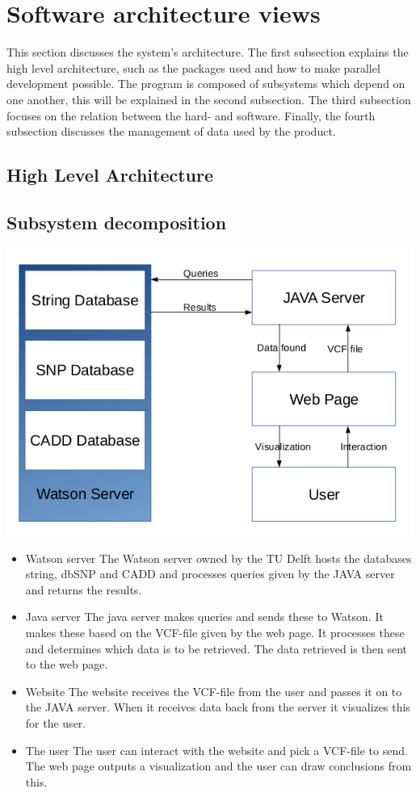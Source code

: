 \section{Software architecture views}
	This section discusses the system's architecture. The first subsection explains the high level architecture, such as the packages used and how to make parallel development possible. The program is composed of subsystems which depend on one another, this will be explained in the second subsection. The third subsection focuses on the relation between the hard- and software. Finally, the fourth subsection discusses the management of data used by the product.
	\subsection{High Level Architecture}
	\subsection{Subsystem decomposition}
		\includegraphics[scale=0.5]{schema1.png}
		\begin{itemize}
			\item Watson server
				\subitem The Watson server owned by the TU Delft hosts the databases string\cite{franceschini2013string}, dbSNP\cite{sherry2001dbsnp} and CADD\cite{kircher2014general} and processes queries given by the JAVA server and returns the results.
			\item Java server
				\subitem The java server makes queries and sends these to Watson. It makes these based on the VCF-file given by the web page. It processes these and determines which data is to be retrieved. The data retrieved is then sent to the web page.
			\item Website
				\subitem The website receives the VCF-file from the user and passes it on to the JAVA server. When it receives data back from the server it visualizes this for the user.
			\item The user 
				\subitem The user can interact with the website and pick a VCF-file to send. The web page outputs a visualization and the user can draw conclusions from this.
		\end{itemize}
